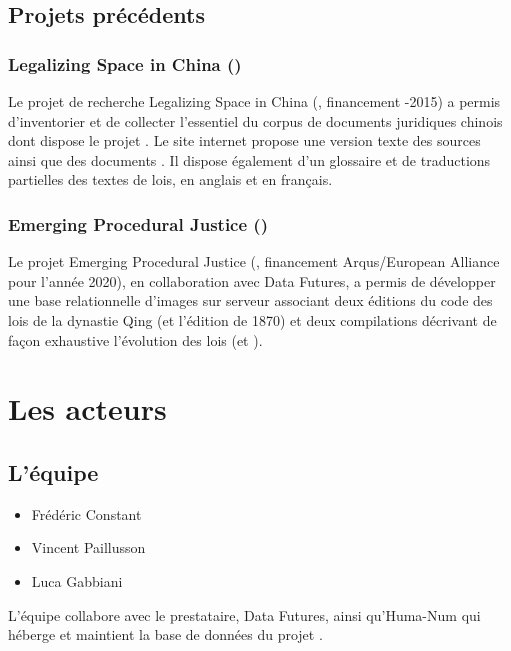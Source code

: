 \subsection*{Projets précédents}
\subsubsection{Legalizing Space in China (\LSC)}
Le projet de recherche Legalizing Space in China (\LSC, financement -2015) a permis d’inventorier et de collecter l’essentiel du corpus de documents juridiques chinois dont dispose le projet \COREL. Le site internet \LSC propose une version texte des sources ainsi que des documents \pdf. Il dispose également d’un glossaire et de traductions partielles des textes de lois, en anglais et en français.

\subsubsection{Emerging Procedural Justice (\EPJ)}
Le projet Emerging Procedural Justice (\EPJ, financement Arqus/European Alliance pour l’année 2020), en collaboration avec Data Futures, a permis de développer une base relationnelle d’images sur serveur \IIIF associant deux éditions du code des lois de la dynastie Qing (\dq et  l'édition de 1870) et deux compilations décrivant de façon exhaustive l’évolution des lois (\genyuan et \huidian).

\newpage
\section*{Les acteurs}
\subsection*{L'équipe}
\begin{itemize}
    \item Frédéric Constant
    \item Vincent Paillusson
    \item Luca Gabbiani
\end{itemize}

    L’équipe collabore avec le prestataire, Data Futures, ainsi qu’Huma-Num qui héberge et maintient la base de données du projet \LSC.
